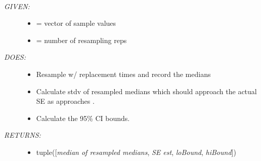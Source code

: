 \documentclass[letterpaper,10pt,english]{sphinxmanual}
\begin{document}
\begin{fulllineitems}
\label{code:gfunc.stats.basic_bootstrap_est}~\begin{description}
\item[{\emph{GIVEN:}}] \leavevmode\begin{itemize}
\item {} 
 = vector of sample values

\item {} 
 = number of resampling reps

\end{itemize}

\item[{\emph{DOES:}}] \leavevmode\begin{itemize}
\item {} 
Resample w/ replacement  times and record the medians

\item {} 
Calculate stdv of resampled medians which should approach
the actual SE as  approaches .

\item {} 
Calculate the 95\% CI bounds.

\end{itemize}

\item[{\emph{RETURNS:}}] \leavevmode\begin{itemize}
\item {} 
tuple({[}\emph{median of resampled medians}, \emph{SE est}, \emph{loBound}, \emph{hiBound}{]})

\end{itemize}

\end{description}

\end{fulllineitems}

\end{document}
